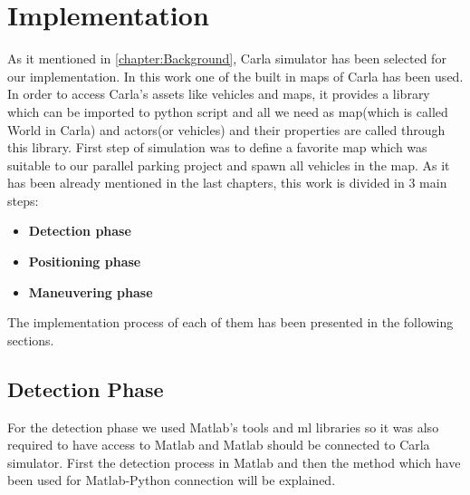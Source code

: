 \chapter{Implementation}\label{chapter:Implementation}
As it mentioned in \ref{chapter:Background}, Carla simulator has been selected for our implementation.  In this work one of the built in maps of Carla has been used. In order to access Carla's assets like vehicles and maps, it provides a library which can be imported to python script and all we need as map(which is called World in Carla) and actors(or vehicles) and their properties are called through this library. First step of simulation was to define a favorite map which was suitable to our parallel parking project and spawn all vehicles in the map. As it has been already mentioned in the last chapters, this work is divided in 3 main steps:
\begin{itemize}
    \item \textbf{Detection phase}
    \item \textbf{Positioning phase}
    \item \textbf{Maneuvering phase}
\end{itemize}
The implementation process of each of them has been presented in the following sections.
\section{Detection Phase}
For the detection phase we used Matlab's tools and \acrlong{ml} libraries so it was also required to have access to Matlab and Matlab should be connected to Carla simulator. First the detection process in Matlab and then the method which have been used for Matlab-Python connection will be explained.
